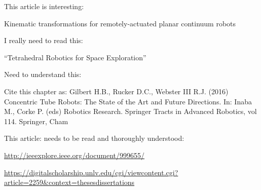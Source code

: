 \documentclass[11pt]{article}
\begin{document}
This article is interesting:

Kinematic transformations for remotely-actuated planar continuum robots

I really need to read this:

``Tetrahedral Robotics for Space Exploration''

Need to understand this:

Cite this chapter as:
Gilbert H.B., Rucker D.C., Webster III R.J. (2016) Concentric Tube Robots: The State of the Art and Future Directions. In: Inaba M., Corke P. (eds) Robotics Research. Springer Tracts in Advanced Robotics, vol 114. Springer, Cham

This article: needs to be read and thoroughly understood:

\url{http://ieeexplore.ieee.org/document/999655/}

\url{https://digitalscholarship.unlv.edu/cgi/viewcontent.cgi?article=2259&context=thesesdissertations}



\end{document}
